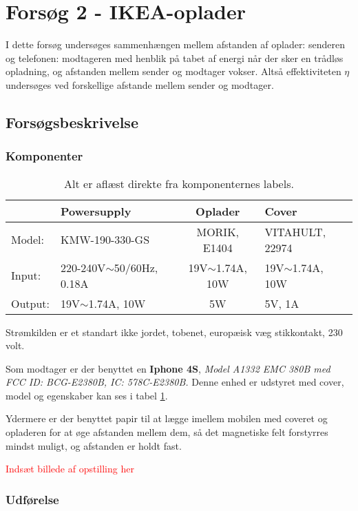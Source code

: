 \section{Forsøg 2 - IKEA-oplader}

I dette forsøg undersøges sammenhængen mellem afstanden af oplader: senderen og telefonen: modtageren med henblik på tabet af energi når der sker en trådløs opladning, og afstanden mellem sender og modtager vokser. Altså effektiviteten $\eta$ undersøges ved forskellige afstande mellem sender og modtager.

\subsection{Forsøgsbeskrivelse}
\subsubsection{Komponenter}

\begin{table}[htbp] %
\centering
\label{sender}
\begin{tabular}{l|l|c|l}
        & Powersupply                  & Oplader             & Cover               \\ \hline
Model:  & KMW-190-330-GS               & MORIK, E1404        & VITAHULT, 22974     \\
Input:  & 220-240V$\sim$50/60Hz, 0.18A & 19V$\sim$1.74A, 10W & 19V$\sim$1.74A, 10W \\
Output: & 19V$\sim$1.74A, 10W          & 5W                  & 5V, 1A             
\end{tabular}
\caption{Alt er aflæst direkte fra komponenternes labels.}
\end{table}

Strømkilden er et standart ikke jordet, tobenet, europæisk væg stikkontakt, 230 volt.

Som modtager er der benyttet en \textbf{Iphone 4S}, \textit{Model A1332 EMC 380B med FCC ID: BCG-E2380B, IC: 578C-E2380B.} 
Denne enhed er udstyret med cover, model og egenskaber kan ses i tabel \ref{sender}.

Ydermere er der benyttet papir til at lægge imellem mobilen med coveret og opladeren for at øge afstanden mellem dem, så det magnetiske felt forstyrres mindst muligt, og afstanden er holdt fast. 

\textcolor{red}{Indsæt billede af opstilling her} 

\subsubsection{Udførelse}

